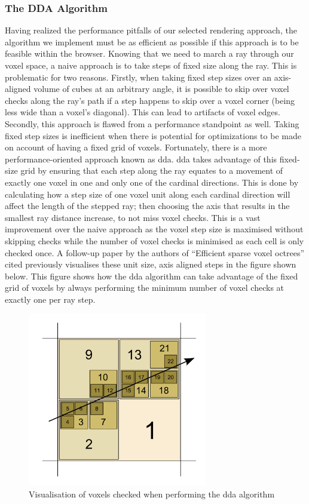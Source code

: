 \documentclass[titlepage]{article}
\begin{document}
\subsubsection{The DDA Algorithm}
Having realized the performance pitfalls of our selected rendering approach, the algorithm we implement must be as efficient as possible if this approach is to be feasible within the browser. Knowing that we need to march a ray through our voxel space, a naive approach is to take steps of fixed size along the ray. This is problematic for two reasons. Firstly, when taking fixed step sizes over an axis-aligned volume of cubes at an arbitrary angle, it is possible to skip over voxel checks along the ray's path if a step happens to skip over a voxel corner (being less wide than a voxel's diagonal). This can lead to artifacts of voxel edges. Secondly, this approach is flawed from a performance standpoint as well. Taking fixed step sizes is inefficient when there is potential for optimizations to be made on account of having a fixed grid of voxels. Fortunately, there is a more performance-oriented approach known as \gls{dda}. \gls{dda} takes advantage of this fixed-size grid by ensuring that each step along the ray equates to a movement of exactly one voxel in one and only one of the cardinal directions. This is done by calculating how a step size of one voxel unit along each cardinal direction will affect the length of the stepped ray; then choosing the axis that results in the smallest ray distance increase, to not miss voxel checks. This is a vast improvement over the naive approach as the voxel step size is maximised without skipping checks while the number of voxel checks is minimised as each cell is only checked once. A follow-up paper \cite{dda} by the authors of ``Efficient sparse voxel octrees'' cited previously visualises these unit size, axis aligned steps in the figure shown below. This figure shows how the \gls{dda} algorithm can take advantage of the fixed grid of voxels by always performing the minimum number of voxel checks at exactly one per ray step.

\begin{figure}[htp]
  \centering
  \includegraphics[width=0.7\textwidth]{dda.png}
  \caption{Visualisation of voxels checked when performing the \gls{dda} algorithm}
\end{figure}
\FloatBarrier
\end{document}
